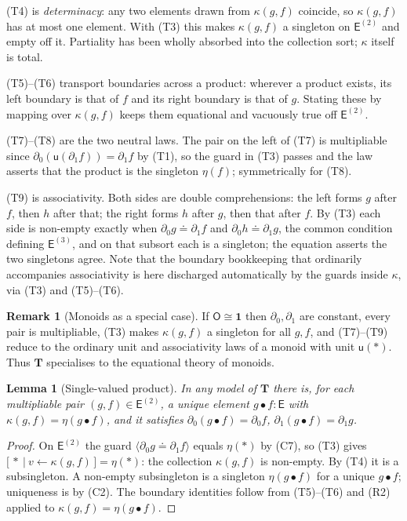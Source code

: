 \documentclass[11pt]{article}
\theoremstyle{definition}
\newtheorem{remark}[definition]{Remark}
\theoremstyle{plain}
\newtheorem{lemma}[definition]{Lemma}
\newcommand{\Ob}{\mathsf{O}}            %
\newcommand{\Ed}{\mathsf{E}}            %
\newcommand{\unit}{\eta}                %
\newcommand{\guard}[1]{\langle #1\rangle}
\newcommand{\eq}{\mathrel{\doteq}}      %
\newcommand{\gen}[2]{#1\!\leftarrow\!#2}%
\newcommand{\dl}{\partial_{0}}          %
\newcommand{\dr}{\partial_{1}}          %
\newcommand{\uu}{\mathsf{u}}            %
\newcommand{\kk}{\kappa}                %
\newcommand{\one}{\mathbf{1}}           %
\newcommand{\pt}{\ast}                  %
\newcommand{\compr}[2]{\bigl[\,#1 \ \big|\ #2\,\bigr]}
\begin{document}
(T4) is \emph{determinacy}: any two elements drawn from $\kk(g,f)$ coincide, so
$\kk(g,f)$ has at most one element. With (T3) this makes $\kk(g,f)$ a singleton
on $\Ed^{(2)}$ and empty off it. Partiality has been wholly absorbed into the
collection sort; $\kk$ itself is total.

(T5)--(T6) transport boundaries across a product: wherever a product exists, its
left boundary is that of $f$ and its right boundary is that of $g$. Stating
these by mapping over $\kk(g,f)$ keeps them equational and vacuously true off
$\Ed^{(2)}$.

(T7)--(T8) are the two neutral laws. The pair on the left of (T7) is multipliable
since $\dl(\uu(\dr f))=\dr f$ by (T1), so the guard in (T3) passes and the law
asserts that the product is the singleton $\unit(f)$; symmetrically for (T8).

(T9) is associativity. Both sides are double comprehensions: the left forms
$g$ after $f$, then $h$ after that; the right forms $h$ after $g$, then that
after $f$. By (T3) each side is non-empty exactly when
$\dl g\eq\dr f$ and $\dl h\eq\dr g$, the common condition defining
$\Ed^{(3)}$, and on that subsort each is a singleton; the equation asserts the
two singletons agree. Note that the boundary bookkeeping that ordinarily
accompanies associativity is here discharged automatically by the guards inside
$\kk$, via (T3) and (T5)--(T6).

\begin{remark}[Monoids as a special case]
If $\Ob\cong\one$ then $\dl,\dr$ are constant, every pair is multipliable, (T3)
makes $\kk(g,f)$ a singleton for all $g,f$, and (T7)--(T9) reduce to the
ordinary unit and associativity laws of a monoid with unit $\uu(\pt)$. Thus
$\mathbf{T}$ specialises to the equational theory of monoids.
\end{remark}

\begin{lemma}[Single-valued product]\label{lem:single}
In any model of $\mathbf{T}$ there is, for each multipliable pair
$(g,f)\in\Ed^{(2)}$, a unique element $g\bullet f\colon\Ed$ with
$\kk(g,f)=\unit(g\bullet f)$, and it satisfies $\dl(g\bullet f)=\dl f$,
$\dr(g\bullet f)=\dr g$.
\end{lemma}
\begin{proof}
On $\Ed^{(2)}$ the guard $\guard{\dl g\eq\dr f}$ equals $\unit(\pt)$ by (C7), so
(T3) gives $\compr{\pt}{\gen{v}{\kk(g,f)}}=\unit(\pt)$: the collection
$\kk(g,f)$ is non-empty. By (T4) it is a subsingleton. A non-empty subsingleton
is a singleton $\unit(g\bullet f)$ for a unique $g\bullet f$; uniqueness is by
(C2). The boundary identities follow from (T5)--(T6) and (R2) applied to
$\kk(g,f)=\unit(g\bullet f)$.
\end{proof}
\end{document}

